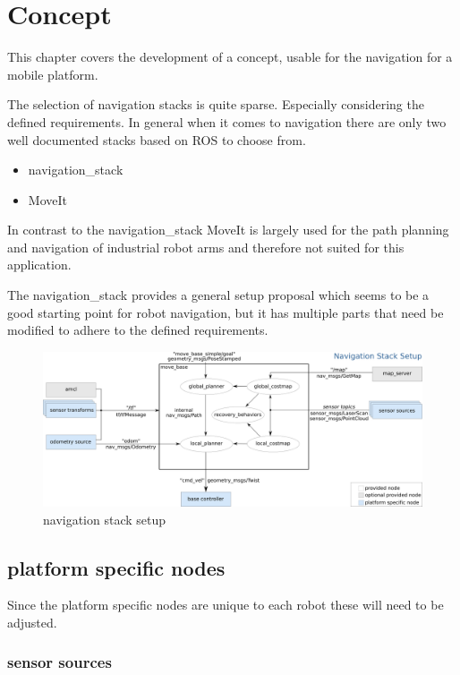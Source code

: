 \chapter{Concept}
\label{Concept}

This chapter covers the development of a concept, usable for the navigation for a mobile platform. 

The selection of navigation stacks is quite sparse. Especially considering the defined requirements. In general when it comes to navigation there are only two well documented stacks based on ROS to choose from.

\begin{itemize}
	\item navigation\_stack
	\item MoveIt
\end{itemize}

In contrast to the navigation\_stack MoveIt is largely used for the path planning and navigation of industrial robot arms and therefore not suited for this application.

The navigation\_stack provides a general setup proposal which seems to be a good starting point for robot navigation, but it has multiple parts that need be modified to adhere to the defined requirements.

\begin{figure}[H]
	\centering
	\includegraphics[width=\textwidth]{Pictures/navigation stack setup}
	\caption{navigation stack setup\cite{movebase}}
	
	\label{navigation stack setup}
\end{figure}


\section{platform specific nodes}
Since the platform specific nodes are unique to each robot these will need to be adjusted.\\
\subsection{sensor sources}


